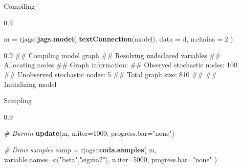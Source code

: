 \documentclass[11pt,ignorenonframetext,]{beamer}
\newenvironment{Shaded}{}{}
\newcommand{\CommentTok}[1]{\textcolor[rgb]{0.38,0.63,0.69}{\textit{#1}}}
\newcommand{\DataTypeTok}[1]{\textcolor[rgb]{0.56,0.13,0.00}{#1}}
\newcommand{\DecValTok}[1]{\textcolor[rgb]{0.25,0.63,0.44}{#1}}
\newcommand{\KeywordTok}[1]{\textcolor[rgb]{0.00,0.44,0.13}{\textbf{#1}}}
\newcommand{\NormalTok}[1]{#1}
\newcommand{\OperatorTok}[1]{\textcolor[rgb]{0.40,0.40,0.40}{#1}}
\newcommand{\StringTok}[1]{\textcolor[rgb]{0.25,0.44,0.63}{#1}}
\let\oldShaded\Shaded
\let\endoldShaded\endShaded
\renewenvironment{Shaded}{\footnotesize\begin{spacing}{0.9}\oldShaded}{\endoldShaded\end{spacing}}
\let\oldverbatim\verbatim
\let\endoldverbatim\endverbatim
\renewenvironment{verbatim}{\footnotesize\begin{spacing}{0.9}\oldverbatim}{\endoldverbatim\end{spacing}}
\begin{document}
\begin{frame}[fragile,t]{Compiling}
\protect\hypertarget{compiling}{}

\scriptsize

\begin{Shaded}
\begin{Highlighting}[]
\NormalTok{m =}\StringTok{ }\NormalTok{rjags}\OperatorTok{::}\KeywordTok{jags.model}\NormalTok{(}
  \KeywordTok{textConnection}\NormalTok{(model), }
  \DataTypeTok{data =}\NormalTok{ d, }\DataTypeTok{n.chains =} \DecValTok{2}
\NormalTok{)}
\end{Highlighting}
\end{Shaded}

\begin{verbatim}
## Compiling model graph
##    Resolving undeclared variables
##    Allocating nodes
## Graph information:
##    Observed stochastic nodes: 100
##    Unobserved stochastic nodes: 5
##    Total graph size: 810
## 
## Initializing model
\end{verbatim}

\end{frame}

\begin{frame}[fragile,t]{Sampling}
\protect\hypertarget{sampling}{}

\begin{Shaded}
\begin{Highlighting}[]
\CommentTok{# Burnin }
\KeywordTok{update}\NormalTok{(m, }\DataTypeTok{n.iter=}\DecValTok{1000}\NormalTok{, }\DataTypeTok{progress.bar=}\StringTok{"none"}\NormalTok{)}

\CommentTok{# Draw samples}
\NormalTok{samp =}\StringTok{ }\NormalTok{rjags}\OperatorTok{::}\KeywordTok{coda.samples}\NormalTok{(}
\NormalTok{  m, }\DataTypeTok{variable.names=}\KeywordTok{c}\NormalTok{(}\StringTok{"beta"}\NormalTok{,}\StringTok{"sigma2"}\NormalTok{), }
  \DataTypeTok{n.iter=}\DecValTok{5000}\NormalTok{, }\DataTypeTok{progress.bar=}\StringTok{"none"}
\NormalTok{)}
\end{Highlighting}
\end{Shaded}

\end{frame}
\end{document}
